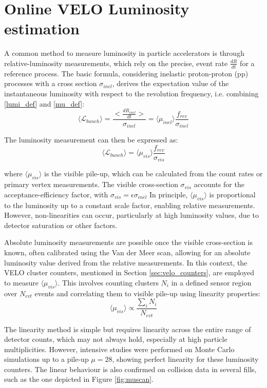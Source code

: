 \section{Online VELO Luminosity estimation}
A common method to measure luminosity in particle accelerators is through relative-luminosity measurements, which rely on the precise, event rate $\frac{dR}{dt}$ for a reference process. The basic formula, considering inelastic proton-proton (pp) processes with a cross section $\sigma_{inel}$, derives the expectation value of the instantaneous luminosity with respect to the revolution frequency, i.e. combining \eqref{lumi_def} and \eqref{mu_def}:
\begin{equation}
    \langle\mathcal{L}_{bunch}\rangle = \dfrac{\bigl<\frac{dR_{inel}}{dt}\bigr>}{\sigma_{inel}} = \langle\mu_{inel}\rangle\frac{f_{rev}}{\sigma_{inel}}
\end{equation}

The luminosity measurement can then be expressed as:
\begin{equation}
    \langle\mathcal{L}_{bunch}\rangle =  \langle\mu_{vis}\rangle\frac{f_{rev}}{\sigma_{vis}}\label{lumi_per_bunch}
\end{equation}

where $\langle\mu_{vis}\rangle$ is the visible pile-up, which can be calculated from the count rates or primary vertex measurements. The visible cross-section $\sigma_{vis}$  accounts for the acceptance-efficiency factor, with 
$\sigma_{vis} = \epsilon \sigma_{inel}$
In principle, $\langle\mu_{vis}\rangle$ is proportional to the luminosity up to a constant scale factor, enabling relative measurements. However, non-linearities can occur, particularly at high luminosity values, due to detector saturation or other factors.

Absolute luminosity measurements are possible once the visible cross-section is known, often calibrated using the Van der Meer scan, allowing for an absolute luminosity value derived from the relative measurements. In this context, the VELO cluster counters, mentioned in Section \ref{sec:velo_counters}, are employed to measure  $\langle\mu_{vis}\rangle$. This involves counting clusters $N_i$ in a defined sensor region over $N_{evt}$ events and correlating them to visible pile-up using linearity properties:
\begin{equation}
    \langle\mu_{vis}\rangle\propto \frac{\sum_i N_i}{N_{evt}}
\end{equation}

The linearity method is simple but requires linearity across the entire range of detector counts, which may not always hold, especially at high particle multiplicities. However, intensive studies were performed on Monte Carlo simulations up to a pile-up $\mu = 28$, showing perfect linearity for these luminosity counters\cite{dan}. The linear behaviour is also confirmed on collision data in several fills, such as the one depicted in Figure \ref{fig:muscan}.

